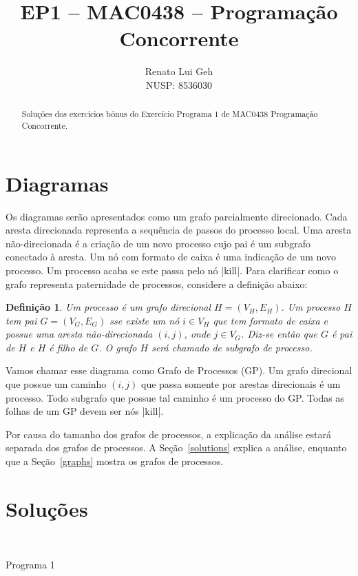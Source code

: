 \documentclass{amsart}
\title[]{EP1 -- MAC0438 -- Programação Concorrente}
\author[]{Renato Lui Geh\\NUSP\@: 8536030}
\makeatletter
\def\subsection{\@startsection{subsection}{3}%
  \z@{.5\linespacing\@plus.7\linespacing}{.1\linespacing}%
  {\normalfont\itshape}}
\theoremstyle{plain}
\newtheorem*{definition}{Definição}
\makeatother
\begin{document}
\begin{abstract}
  Soluções dos exercícios bônus do Exercício Programa 1 de MAC0438 Programação Concorrente.
  \vspace*{-2.5em}
\end{abstract}

\maketitle

\section{Diagramas}

Os diagramas serão apresentados como um grafo parcialmente direcionado. Cada aresta direcionada
representa a sequência de passos do processo local. Uma aresta não-direcionada é a criação de um
novo processo cujo pai é um subgrafo conectado à aresta. Um nó com formato de caixa é uma indicação
de um novo processo. Um processo acaba se este passa pelo nó |kill|. Para clarificar como
o grafo representa paternidade de processos, considere a definição abaixo:

\begin{definition}
  Um processo é um grafo direcional $H=(V_H,E_H)$. Um processo $H$ tem pai $G=(V_G,E_G)$ sse existe
  um nó $i\in V_H$ que tem formato de caixa e possue uma aresta não-direcionada $(i,j)$, onde
  $j\in V_G$. Diz-se então que $G$ é pai de $H$ e $H$ é filho de $G$. O grafo $H$ será chamado de
  subgrafo de processo.
\end{definition}

Vamos chamar esse diagrama como Grafo de Processos (GP). Um grafo direcional que possue um caminho
$(i,j)$ que passa somente por arestas direcionais é um processo. Todo subgrafo que possue tal
caminho é um processo do GP\@. Todas as folhas de um GP devem ser nós |kill|.

Por causa do tamanho dos grafos de processos, a explicação da análise estará separada dos grafos
de processos. A Seção~\ref{solutions} explica a análise, enquanto que a Seção~\ref{graphs} mostra
os grafos de processos.

\section{Soluções}~\label{solutions}

\subsection{Programa 1}
\end{document}
